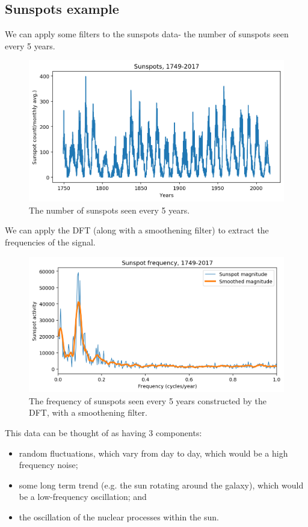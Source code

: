 \documentclass[a4paper, openany]{memoir}
\begin{document}
\subsection{Sunspots example}
We can apply some filters to the sunspots data- the number of sunspots seen every 5 years.
\begin{figure}[H]
    \centering
    \includegraphics[scale=0.6]{src/6.25 sunspots original.png}
    \caption{The number of sunspots seen every 5 years.}
\end{figure}
\noindent We can apply the DFT (along with a smoothening filter) to extract the frequencies of the signal.
\begin{figure}[H]
    \centering
    \includegraphics[scale=0.6]{src/6.26 sunspots smooth.png}
    \caption{The frequency of sunspots seen every 5 years constructed by the DFT, with a smoothening filter.}
\end{figure}
\noindent This data can be thought of as having 3 components:
\begin{itemize}
    \item random fluctuations, which vary from day to day, which would be a high frequency noise;
    \item some long term trend (e.g. the sun rotating around the galaxy), which would be a low-frequency oscillation; and 
    \item the oscillation of the nuclear processes within the sun.
\end{itemize}
\end{document}
